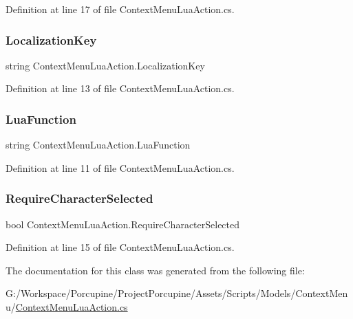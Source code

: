 Definition at line 17 of file Context\+Menu\+Lua\+Action.\+cs.

\mbox{\label{class_context_menu_lua_action_a38f4877889996ba9b9349703ac2b5813}} 
\subsubsection{\texorpdfstring{Localization\+Key}{LocalizationKey}}
{\footnotesize\ttfamily string Context\+Menu\+Lua\+Action.\+Localization\+Key}



Definition at line 13 of file Context\+Menu\+Lua\+Action.\+cs.

\mbox{\label{class_context_menu_lua_action_a52867e2eb4f5f226a0aa3b9f4dca271d}} 
\subsubsection{\texorpdfstring{Lua\+Function}{LuaFunction}}
{\footnotesize\ttfamily string Context\+Menu\+Lua\+Action.\+Lua\+Function}



Definition at line 11 of file Context\+Menu\+Lua\+Action.\+cs.

\mbox{\label{class_context_menu_lua_action_a3add6c1930c86eaf583ef3057e190460}} 
\subsubsection{\texorpdfstring{Require\+Character\+Selected}{RequireCharacterSelected}}
{\footnotesize\ttfamily bool Context\+Menu\+Lua\+Action.\+Require\+Character\+Selected}



Definition at line 15 of file Context\+Menu\+Lua\+Action.\+cs.



The documentation for this class was generated from the following file\+:\begin{DoxyCompactItemize}
\item 
G\+:/\+Workspace/\+Porcupine/\+Project\+Porcupine/\+Assets/\+Scripts/\+Models/\+Context\+Menu/\hyperlink{_context_menu_lua_action_8cs}{Context\+Menu\+Lua\+Action.\+cs}\end{DoxyCompactItemize}
